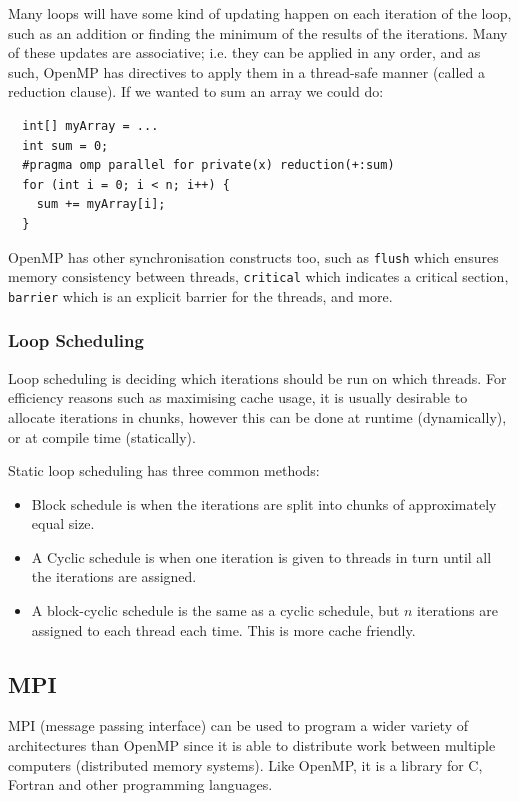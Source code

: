 Many loops will have some kind of updating happen on each iteration of
the loop, such as an addition or finding the minimum of the results of
the iterations. Many of these updates are associative; i.e. they can
be applied in any order, and as such, OpenMP has directives to apply
them in a thread-safe manner (called a reduction clause). If we wanted
to sum an array we could do:

\begin{verbatim}
  int[] myArray = ...
  int sum = 0;
  #pragma omp parallel for private(x) reduction(+:sum)
  for (int i = 0; i < n; i++) {
    sum += myArray[i];
  }
\end{verbatim}

OpenMP has other synchronisation constructs too, such
as \texttt{flush} which ensures memory consistency between
threads, \texttt{critical} which indicates a critical
section, \texttt{barrier} which is an explicit barrier for the
threads, and more.

\subsubsection{Loop Scheduling}

Loop scheduling is deciding which iterations should be run on which
threads. For efficiency reasons such as maximising cache usage, it is
usually desirable to allocate iterations in chunks, however this can
be done at runtime (dynamically), or at compile time
(statically).

Static loop scheduling has three common methods:

\begin{itemize}
\item Block schedule is when the iterations are split into chunks of
approximately equal size.
\item A Cyclic schedule is when one iteration is given to threads in
turn until all the iterations are assigned.
\item A block-cyclic schedule is the same as a cyclic schedule, but
$n$ iterations are assigned to each thread each time. This is more
cache friendly.
\end{itemize}

\subsection{MPI}

MPI (message passing interface) can be used to program a wider variety of architectures than
OpenMP since it is able to distribute work between multiple computers
(distributed memory systems). Like OpenMP, it is a library for C,
Fortran and other programming languages.

